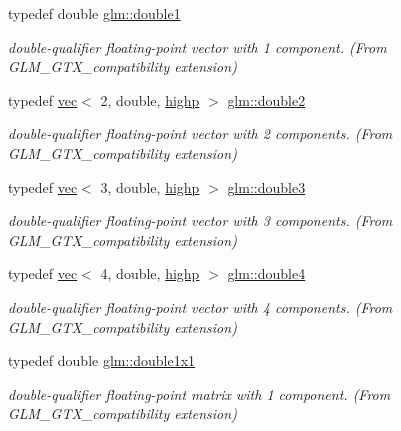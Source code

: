 \begin{DoxyCompactItemize}
typedef double \mbox{\hyperlink{group__gtx__compatibility_gab8b88350212cea916857cb2f49b8a29f}{glm\+::double1}}
\begin{DoxyCompactList}\small\item\em double-\/qualifier floating-\/point vector with 1 component. (From G\+L\+M\+\_\+\+G\+T\+X\+\_\+compatibility extension) \end{DoxyCompactList}\item 
typedef \mbox{\hyperlink{structglm_1_1vec}{vec}}$<$ 2, double, \mbox{\hyperlink{namespaceglm_a36ed105b07c7746804d7fdc7cc90ff25ac6f7eab42eacbb10d59a58e95e362074}{highp}} $>$ \mbox{\hyperlink{group__gtx__compatibility_gaadf812a4d848bf77684844269e1d44eb}{glm\+::double2}}
\begin{DoxyCompactList}\small\item\em double-\/qualifier floating-\/point vector with 2 components. (From G\+L\+M\+\_\+\+G\+T\+X\+\_\+compatibility extension) \end{DoxyCompactList}\item 
typedef \mbox{\hyperlink{structglm_1_1vec}{vec}}$<$ 3, double, \mbox{\hyperlink{namespaceglm_a36ed105b07c7746804d7fdc7cc90ff25ac6f7eab42eacbb10d59a58e95e362074}{highp}} $>$ \mbox{\hyperlink{group__gtx__compatibility_ga59c2d0879cea219643aec2f75b8beee9}{glm\+::double3}}
\begin{DoxyCompactList}\small\item\em double-\/qualifier floating-\/point vector with 3 components. (From G\+L\+M\+\_\+\+G\+T\+X\+\_\+compatibility extension) \end{DoxyCompactList}\item 
typedef \mbox{\hyperlink{structglm_1_1vec}{vec}}$<$ 4, double, \mbox{\hyperlink{namespaceglm_a36ed105b07c7746804d7fdc7cc90ff25ac6f7eab42eacbb10d59a58e95e362074}{highp}} $>$ \mbox{\hyperlink{group__gtx__compatibility_gadfb754a50db97dcefbd7a3435ad6eda4}{glm\+::double4}}
\begin{DoxyCompactList}\small\item\em double-\/qualifier floating-\/point vector with 4 components. (From G\+L\+M\+\_\+\+G\+T\+X\+\_\+compatibility extension) \end{DoxyCompactList}\item 
typedef double \mbox{\hyperlink{group__gtx__compatibility_ga1c87d3042377335eb050a20ab0ec148a}{glm\+::double1x1}}
\begin{DoxyCompactList}\small\item\em double-\/qualifier floating-\/point matrix with 1 component. (From G\+L\+M\+\_\+\+G\+T\+X\+\_\+compatibility extension) \end{DoxyCompactList}\item 

\end{DoxyCompactItemize}
